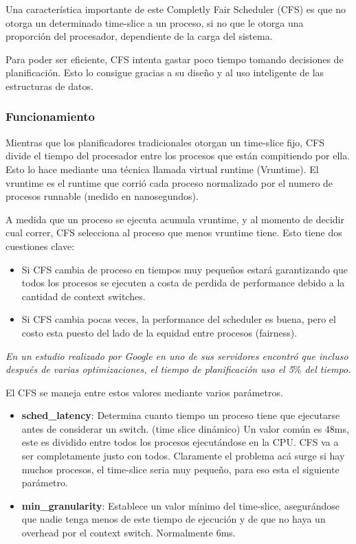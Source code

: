 \documentclass[titlepage,a4paper]{article}
\begin{document}
Una característica importante de este Completly Fair Scheduler (CFS) es que no otorga un determinado time-slice a un proceso, si no que le otorga una proporción del procesador, dependiente de la carga del sistema. 

Para poder ser eficiente, CFS intenta gastar poco tiempo tomando decisiones de planificación. Esto lo consigue gracias a su diseño y al uso inteligente de las estructuras de datos.

\subsubsection*{Funcionamiento}
Mientras que los planificadores tradicionales otorgan un time-slice fijo, CFS divide el tiempo del procesador entre los procesos que están compitiendo por ella. Esto lo hace mediante una técnica llamada virtual runtime (Vruntime). El vruntime es el runtime que corrió cada proceso normalizado por el numero de procesos runnable (medido en nanosegundos).

A medida que un proceso se ejecuta acumula vruntime, y al momento de decidir cual correr, CFS selecciona al proceso que menos vruntime tiene. Esto tiene dos cuestiones clave:
\begin{itemize}
    \item Si CFS cambia de proceso en tiempos muy pequeños estará garantizando que todos los procesos se ejecuten a costa de perdida de performance debido a la cantidad de context switches. 
    \item Si CFS cambia pocas veces, la performance del scheduler es buena, pero el costo esta puesto del lado de la equidad entre procesos (fairness).
\end{itemize}

\textit{En un estudio realizado por Google en uno de sus servidores encontró que incluso después de varias optimizaciones, el tiempo de planificación uso el 5$\%$ del tiempo.}

\medskip

El CFS se maneja entre estos valores mediante varios parámetros.
\begin{itemize}
    \item \textbf{sched\_latency}: Determina cuanto tiempo un proceso tiene que ejecutarse antes de considerar un switch. (time slice dinámico) Un valor común es 48ms, este es dividido entre todos los procesos ejecutándose en la CPU. CFS va a ser completamente justo con todos. Claramente el problema acá surge si hay muchos procesos, el time-slice seria muy pequeño, para eso esta el siguiente parámetro.
    
    \item \textbf{min\_granularity}: Establece un valor mínimo del time-slice, asegurándose que nadie tenga menos de este tiempo de ejecución y de que no haya un overhead por el context switch. Normalmente 6ms.
\end{itemize}
\end{document}
